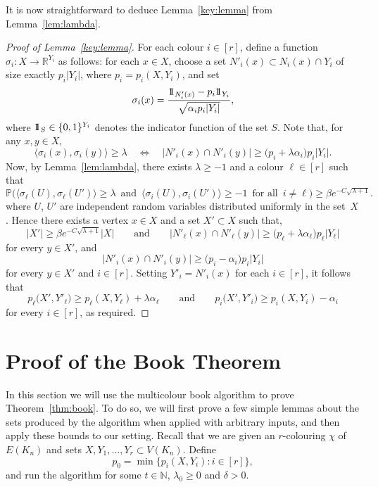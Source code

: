\documentclass[12pt,reqno]{amsart}
\theoremstyle{definition}
\theoremstyle{remark}
\newcommand\N{\mathbb{N}}
\newcommand\R{\mathbb{R}}
\def\Pr{\mathbb{P}}
\newcommand\id{\hbox{$1\mkern-6.5mu1$}}
\renewcommand{\ge}{\geqslant}
\renewcommand{\to}{\rightarrow}
\def\R{\mathbb{R}}
\def\N{\mathbb{N}}
\begin{document}
It is now straightforward to deduce Lemma~\ref{key:lemma} from Lemma~\ref{lem:lambda}. 


\begin{proof}[Proof of Lemma~\ref{key:lemma}] 
For each colour $i \in [r]$, define a function $\sigma_i \colon X \to \R^{Y_i}$ as follows: for each $x \in X$, choose a set $N'_i(x) \subset N_i(x) \cap Y_i$ of size exactly $p_i|Y_i|$, where $p_i = p_i(X,Y_i)$, and set
$$\sigma_i(x) = \frac{\id_{N'_i(x)} - p_i\id_{Y_i}}{\sqrt{\alpha_ip_i|Y_i|}},$$
where $\id_S \in \{0,1\}^{Y_i}$ denotes the indicator function of the set $S$. Note that, for any $x,y\in X$,
$$\big\langle \sigma_i(x),\sigma_i(y) \big\rangle \ge \lambda \quad \Leftrightarrow \quad |N'_i(x) \cap N'_i(y)|\ge \big( p_i + \lambda\alpha_i \big) p_i |Y_i|.$$
Now, by Lemma~\ref{lem:lambda}, there exists $\lambda \ge -1$ and a colour $\ell \in [r]$ such that
$$\Pr\Big( \big\langle \sigma_\ell(U),\sigma_\ell(U') \big\rangle \ge \lambda \, \text{ and } \, \big\langle \sigma_i(U), \sigma_i(U') \big\rangle \ge -1 \, \text{ for all } \, i \ne \ell \Big) \ge \beta e^{- C\sqrt{\lambda + 1}}.$$
where $U$, $U'$ are independent random variables distributed uniformly in the set~$X$. Hence there exists a vertex $x \in X$ and a set $X' \subset X$ such that, 
$$|X'| \ge \beta e^{- C \sqrt{\lambda + 1}} |X| \qquad \text{and} \qquad |N'_\ell(x) \cap N'_\ell(y)| \ge \big( p_\ell + \lambda\alpha_\ell \big) p_\ell |Y_\ell |$$
for every $y \in X'$, and
$$|N'_i(x) \cap N'_i(y)|\ge \big( p_i - \alpha_i \big) p_i |Y_i|$$
for every $y \in X'$ and $i \in [r]$. Setting $Y'_i = N'_i(x)$ for each $i \in [r]$, it follows that
$$p_\ell\big( X', Y'_\ell \big) \ge p_\ell(X,Y_\ell) + \lambda \alpha_\ell \qquad \text{and} \qquad p_i\big( X', Y'_i \big) \ge p_i(X,Y_i) - \alpha_i$$
for every $i \in [r]$, as required. 
\end{proof}


\section{Proof of the Book Theorem}\label{sec:book:proof}

In this section we will use the multicolour book algorithm to prove Theorem~\ref{thm:book}. To do so, we will first prove a few simple lemmas about the sets produced by the algorithm when applied with arbitrary inputs, and then apply these bounds to our setting. Recall that we are given an $r$-colouring $\chi$ of $E(K_n)$ and %
sets $X,Y_1,\ldots,Y_r \subset V(K_n)$. Define 
\begin{equation}\label{def:p0}
p_0 = \min\big\{ p_i(X,Y_i) : i \in [r] \big\},
\end{equation}
and run the algorithm for some $t \in \N$, $\lambda_0 \ge 0$ and $\delta > 0$.
\end{document}
